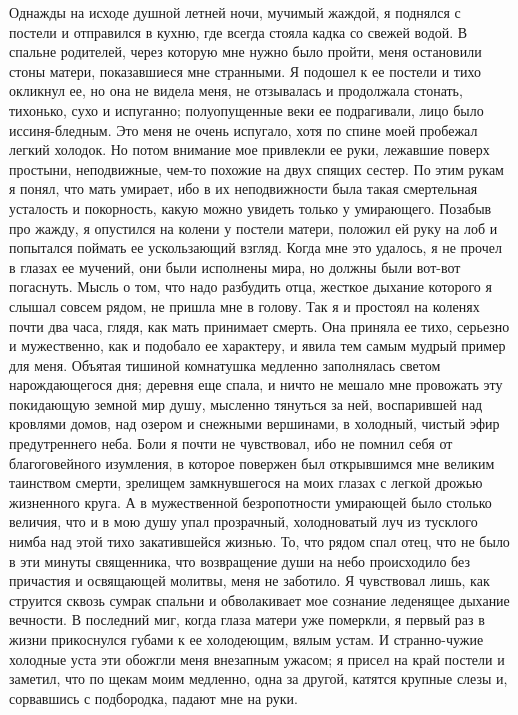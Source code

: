 Однажды на  исходе душной  летней ночи, мучимый  жаждой, я  поднялся с
постели и отправился в кухню, где всегда стояла кадка со свежей водой.
В  спальне  родителей,  через  которую мне  нужно  было  пройти,  меня
остановили стоны  матери, показавшиеся мне  странными. Я подошел  к ее
постели и  тихо окликнул ее,  но она не  видела меня, не  отзывалась и
продолжала стонать, тихонько, сухо  и испуганно; полуопущенные веки ее
подрагивали,  лицо было  иссиня-бледным. Это  меня не  очень испугало,
хотя  по спине  моей пробежал  легкий холодок.  Но потом  внимание мое
привлекли  ее  руки,  лежавшие поверх  простыни,  неподвижные,  чем-то
похожие  на двух  спящих  сестер.  По этим  рукам  я  понял, что  мать
умирает, ибо  в их  неподвижности была  такая смертельная  усталость и
покорность,  какую  можно увидеть  только  у  умирающего. Позабыв  про
жажду, я опустился на колени у  постели матери, положил ей руку на лоб
и попытался поймать  ее ускользающий взгляд. Когда мне  это удалось, я
не прочел в глазах ее мучений, они были исполнены мира, но должны были
вот-вот  погаснуть. Мысль  о  том, что  надо  разбудить отца,  жесткое
дыхание которого я слышал совсем рядом,  не пришла мне в голову. Так я
и  простоял на  коленях  почти  два часа,  глядя,  как мать  принимает
смерть. Она приняла ее тихо, серьезно и мужественно, как и подобало ее
характеру, и явила  тем самым мудрый пример для  меня. Объятая тишиной
комнатушка медленно заполнялась светом нарождающегося дня; деревня еще
спала, и ничто не мешало мне провожать эту покидающую земной мир душу,
мысленно тянуться за ней, воспарившей над кровлями домов, над озером и
снежными вершинами, в холодный, чистый эфир предутреннего неба. Боли я
почти не чувствовал,  ибо не помнил себя  от благоговейного изумления,
в  которое  повержен был  открывшимся  мне  великим таинством  смерти,
зрелищем  замкнувшегося  на моих  глазах  с  легкой дрожью  жизненного
круга. А в мужественной  безропотности умирающей было столько величия,
что и в  мою душу упал прозрачный, холодноватый луч  из тусклого нимба
над этой  тихо закатившейся жизнью.  То, что  рядом спал отец,  что не
было в эти минуты священника, что возвращение души на небо происходило
без причастия  и освящающей  молитвы, меня  не заботило.  Я чувствовал
лишь, как струится  сквозь сумрак спальни и  обволакивает мое сознание
леденящее дыхание  вечности. В последний  миг, когда глаза  матери уже
померкли, я  первый раз  в жизни прикоснулся  губами к  ее холодеющим,
вялым устам. И странно-чужие холодные  уста эти обожгли меня внезапным
ужасом;  я  присел на  край  постели  и  заметил,  что по  щекам  моим
медленно,  одна  за другой,  катятся  крупные  слезы и,  сорвавшись  с
подбородка, падают мне на руки.

